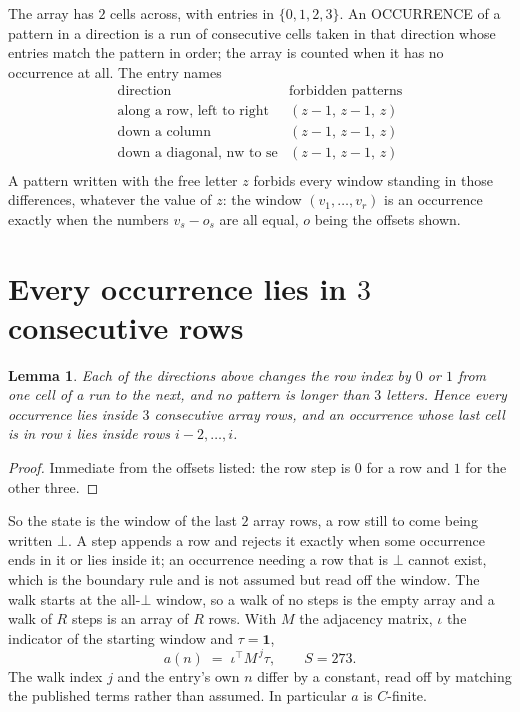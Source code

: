 \documentclass[11pt,a4paper]{article}
\theoremstyle{plain}
\newtheorem{lemma}[theorem]{Lemma}
\theoremstyle{definition}
\begin{document}
The array has $2$ cells across, with entries in $\{0,1,2,3\}$. An OCCURRENCE of a pattern in a
direction is a run of consecutive cells taken in that direction whose entries match the pattern
in order; the array is counted when it has no occurrence at all. The entry names
\[
\begin{array}{ll}
\text{direction} & \text{forbidden patterns} \\[2pt]
\text{along a row, left to right} & (z-1,\,z-1,\,z) \\
\text{down a column} & (z-1,\,z-1,\,z) \\
\text{down a diagonal, nw to se} & (z-1,\,z-1,\,z) \\
\end{array}
\]
 A pattern written with the free letter $z$ forbids every window standing in those differences, whatever the value of $z$: the window $(v_1,\dots,v_r)$ is an occurrence exactly when the numbers $v_s-o_s$ are all equal, $o$ being the offsets shown.

\section{Every occurrence lies in $3$ consecutive rows}

\begin{lemma}\label{lem:win}
Each of the directions above changes the row index by $0$ or $1$ from one cell of a run to the
next, and no pattern is longer than $3$ letters. Hence every occurrence lies inside $3$
consecutive array rows, and an occurrence whose last cell is in row $i$ lies inside rows
$i-2,\dots,i$.
\end{lemma}

\begin{proof}
Immediate from the offsets listed: the row step is $0$ for a row and $1$ for the other three.
\end{proof}

So the state is the window of the last $2$ array rows, a row still to come being written
$\bot$. A step appends a row and rejects it exactly when some occurrence ends in it or lies
inside it; an occurrence needing a row that is $\bot$ cannot exist, which is the boundary rule
and is not assumed but read off the window. The walk starts at the all-$\bot$ window, so a walk
of no steps is the empty array and a walk of $R$ steps is an array of $R$ rows. With $M$ the
adjacency matrix, $\iota$ the indicator of the starting window and $\tau=\mathbf{1}$,
\[
a(n)\;=\;\iota^{\!\top}M^{\,j}\tau ,\qquad S=273.
\]
The walk index $j$ and the entry's own $n$ differ by a constant, read off by matching the
published terms rather than assumed. In particular $a$ is $C$-finite.
\end{document}
